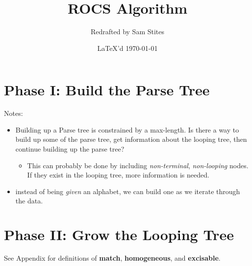 \documentclass{article}
\begin{document}
\title{ROCS Algorithm}
\author{Redrafted by Sam Stites}
\date{\LaTeX 'd \today}
\maketitle

\section{Phase I: Build the Parse Tree}

Notes:

\begin{itemize}

\item Building up a Parse tree is constrained by a max-length. Is there a way to
build up some of the parse tree, get information about the looping tree, then
continue building up the parse tree?
  \begin{itemize}
    \item This can probably be done by including \textit{non-terminal},
      \textit{non-looping} nodes. If they exist in the looping tree, more
      information is needed.
  \end{itemize}

\item instead of being \textit{given} an alphabet, we can build one as we
  iterate through the data.

\end{itemize}

\section{Phase II: Grow the Looping Tree}

See Appendix for definitions of {\bf match}, {\bf homogeneous}, and {\bf
excisable}.
\end{document}
